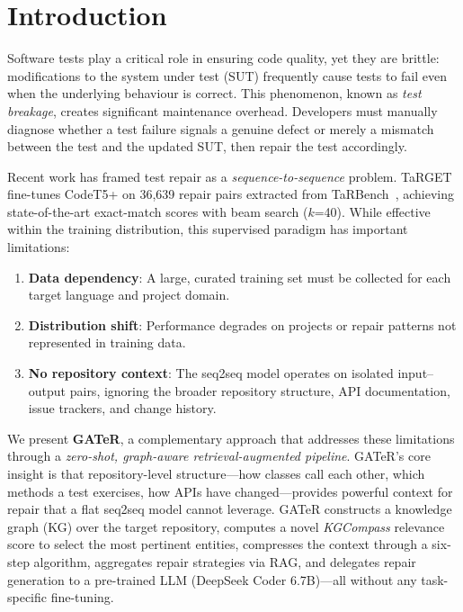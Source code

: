\documentclass[conference,10pt]{IEEEtran}
\begin{document}
\section{Introduction}
\label{sec:introduction}

Software tests play a critical role in ensuring code quality, yet they
are brittle: modifications to the system under test (SUT) frequently
cause tests to fail even when the underlying behaviour is correct. This
phenomenon, known as \emph{test breakage}, creates significant
maintenance overhead. Developers must manually diagnose whether a test
failure signals a genuine defect or merely a mismatch between the test
and the updated SUT, then repair the test accordingly.

Recent work has framed test repair as a \emph{sequence-to-sequence}
problem. TaRGET~\cite{target2024} fine-tunes CodeT5+ on 36,639 repair
pairs extracted from TaRBench~\cite{tarbench2023}, achieving
state-of-the-art exact-match scores with beam search ($k$=40). While
effective within the training distribution, this supervised paradigm
has important limitations:

\begin{enumerate}
    \item \textbf{Data dependency}: A large, curated training set must be
          collected for each target language and project domain.
    \item \textbf{Distribution shift}: Performance degrades on projects or
          repair patterns not represented in training data.
    \item \textbf{No repository context}: The seq2seq model operates on
          isolated input--output pairs, ignoring the broader repository
          structure, API documentation, issue trackers, and change history.
\end{enumerate}

We present \textbf{GATeR}, a complementary approach that addresses these
limitations through a \emph{zero-shot, graph-aware retrieval-augmented
pipeline}. GATeR's core insight is that repository-level structure---how
classes call each other, which methods a test exercises, how APIs have
changed---provides powerful context for repair that a flat seq2seq model
cannot leverage. GATeR constructs a knowledge graph (KG) over the
target repository, computes a novel \emph{KGCompass} relevance score
to select the most pertinent entities, compresses the context through a
six-step algorithm, aggregates repair strategies via RAG, and
delegates repair generation to a pre-trained LLM (DeepSeek Coder
6.7B)---all without any task-specific fine-tuning.
\end{document}
